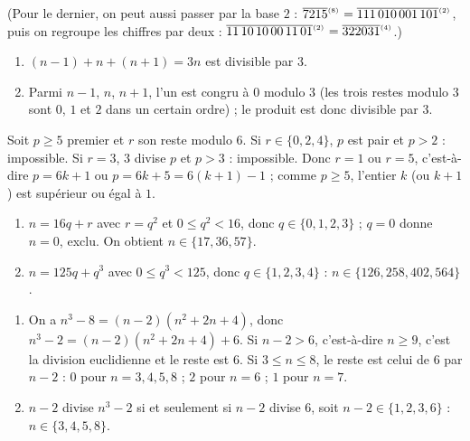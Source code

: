 \begin{corrige}
\begin{sol}
(Pour le dernier, on peut aussi passer par la base $2$ : $\overline{7215}^{_{(8)}} = \overline{111\,010\,001\,101}^{_{(2)}}$,
puis on regroupe les chiffres par deux : $\overline{11\,10\,10\,00\,11\,01}^{_{(2)}} = \overline{322031}^{_{(4)}}$.)
\end{sol}
%
\begin{sol}
\begin{enumerate}
\item $(n-1) + n + (n+1) = 3n$ est divisible par $3$.
\item Parmi $n-1$, $n$, $n+1$, l'un est congru \`a $0$ modulo $3$ (les trois restes modulo $3$ sont $0$, $1$ et $2$ dans un certain ordre) ;
      le produit est donc divisible par $3$.
\end{enumerate}
\end{sol}
%
\begin{sol}
Soit $p \geq 5$ premier et $r$ son reste modulo $6$. Si $r \in \{0, 2, 4\}$, $p$ est pair et $p > 2$ : impossible.
Si $r = 3$, $3$ divise $p$ et $p > 3$ : impossible. Donc $r = 1$ ou $r = 5$, c'est-\`a-dire
$p = 6k+1$ ou $p = 6k + 5 = 6(k+1) - 1$ ; comme $p \geq 5$, l'entier $k$ (ou $k+1$) est sup\'erieur ou \'egal \`a $1$.
\end{sol}
%
\begin{sol}
\begin{enumerate}
\item $n = 16 q + r$ avec $r = q^2$ et $0 \leq q^2 < 16$, donc $q \in \{0, 1, 2, 3\}$ ; $q = 0$ donne $n = 0$, exclu.
      On obtient $n \in \{17, 36, 57\}$.
\item $n = 125 q + q^3$ avec $0 \leq q^3 < 125$, donc $q \in \{1, 2, 3, 4\}$ : $n \in \{126, 258, 402, 564\}$.
\end{enumerate}
\end{sol}
%
\begin{sol}
\begin{enumerate}
\item On a $n^3 - 8 = (n-2)(n^2 + 2n + 4)$, donc $n^3 - 2 = (n-2)(n^2+2n+4) + 6$.
      Si $n - 2 > 6$, c'est-\`a-dire $n \geq 9$, c'est la division euclidienne et le reste est $6$.
      Si $3 \leq n \leq 8$, le reste est celui de $6$ par $n - 2$ :
      $0$ pour $n = 3, 4, 5, 8$ ; $2$ pour $n = 6$ ; $1$ pour $n = 7$.
\item $n - 2$ divise $n^3 - 2$ si et seulement si $n - 2$ divise $6$, soit $n - 2 \in \{1, 2, 3, 6\}$ : $n \in \{3, 4, 5, 8\}$.
\end{enumerate}
\end{sol}

\end{corrige}
